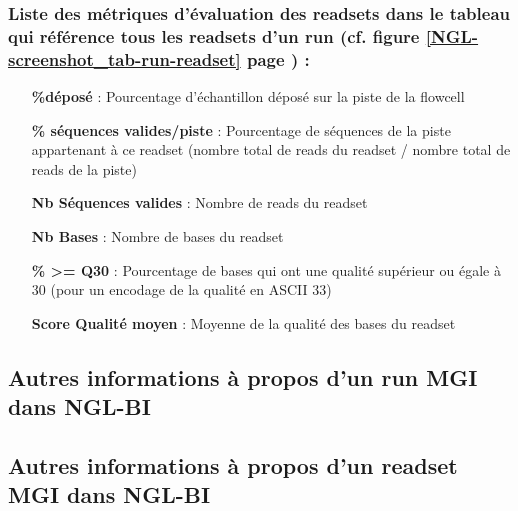 \subsubsection*{Liste des métriques d'évaluation des readsets dans le tableau qui référence tous les readsets d'un run (cf. figure \ref{NGL-screenshot_tab-run-readset} page \pageref{NGL-screenshot_tab-run-readset}) :}
\begin{itemize}
    \item[\textbf{\%déposé} :] Pourcentage d'échantillon déposé sur la piste de la flowcell
    \item[\textbf{\% séquences valides/piste} :] Pourcentage de séquences de la piste appartenant à ce readset (nombre total de reads du readset / nombre total de reads de la piste)
    \item[\textbf{Nb Séquences valides} :] Nombre de reads du readset
    \item[\textbf{Nb Bases} :] Nombre de bases du readset
    \item[\textbf{\% >= Q30} :] Pourcentage de bases qui ont une qualité supérieur ou égale à 30 (pour un encodage de la qualité en ASCII 33)
    \item[\textbf{Score Qualité moyen} :] Moyenne de la qualité des bases du readset
\end{itemize}


\subsection*{Autres informations à propos d'un run MGI dans NGL-BI}

\subsection*{Autres informations à propos d'un readset MGI dans NGL-BI}